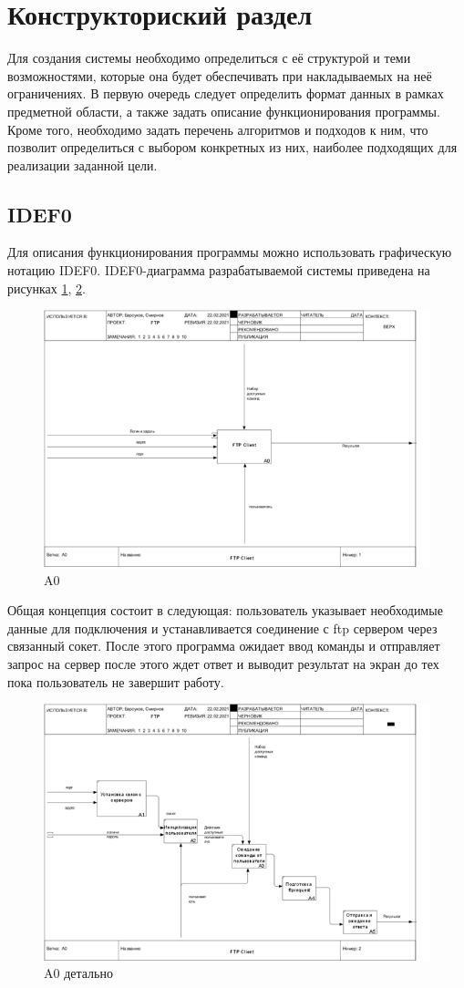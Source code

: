 \section{Конструкториский раздел}
Для создания системы необходимо определиться с её структурой и теми возможностями, которые она будет обеспечивать при накладываемых на неё ограничениях. 
В первую очередь следует определить формат данных в рамках предметной области, а также задать описание функционирования программы. 
Кроме того, необходимо задать перечень алгоритмов и подходов к ним, что позволит определиться с выбором конкретных из них, наиболее подходящих для реализации заданной цели.

\subsection{IDEF0}
Для описания функционирования программы можно использовать графическую нотацию IDEF0. 
IDEF0-диаграмма разрабатываемой системы приведена на рисунках \ref{fig:2}, \ref{fig:3}.

\begin{figure}[H]
	\centering
	\includegraphics[width=0.7\linewidth]{src/img/2}
	\caption{A0}
	\label{fig:2}
\end{figure}

Общая концепция состоит в следующая: пользователь указывает необходимые данные для подключения и устанавливается соединение с ftp сервером через связанный сокет. 
После этого программа ожидает ввод команды и отправляет запрос  на сервер после этого ждет ответ и выводит результат на экран до тех пока пользователь не завершит работу.

\begin{figure}[H]
	\centering
	\includegraphics[width=0.7\linewidth]{src/img/3}
	\caption{A0 детально}
	\label{fig:3}
\end{figure}




